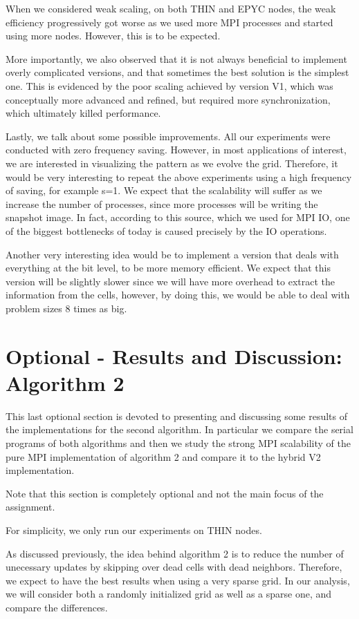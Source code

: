 \documentclass{report}
\begin{document}
When we considered weak scaling, on both THIN and EPYC nodes, the weak 
efficiency progressively got worse as we used more MPI processes and started using 
more nodes. However, this is to be expected.

More importantly, we also observed that it is not always beneficial to implement overly 
complicated versions, and that sometimes the best solution is the simplest one. 
This is evidenced by the poor scaling achieved by version V1, which was conceptually more 
advanced and refined, but required more synchronization, which ultimately killed performance.

Lastly, we talk about some possible improvements. All our experiments were conducted 
with zero frequency saving. However, in most applications of interest, we are interested 
in visualizing the pattern as we evolve the grid. Therefore, it would be very 
interesting to repeat the above experiments using a high frequency of saving, for 
example s=1. We expect that the scalability will suffer as we increase the number of 
processes, since more processes will be writing the snapshot image. In fact, according 
to this\cite{MPIIOtalk} source, which we used for MPI IO, one of the biggest bottlenecks of today 
is caused precisely by the IO operations. 

Another very interesting idea would be to implement a version that deals with everything 
at the bit level, to be more memory efficient. We expect that this version 
will be slightly slower since we will have more overhead to extract the information 
from the cells, however, by doing this, we would be able to deal with problem sizes 
8 times as big. 

\section{Optional - Results and Discussion: Algorithm 2}

This last optional section is devoted to presenting and discussing some results 
of the implementations for the second algorithm. In particular we compare the serial 
programs of both algorithms and then we study the strong MPI scalability of the pure MPI 
implementation of algorithm 2 and compare it to the hybrid V2 implementation. 

Note that this section is completely optional and not the main focus of the 
assignment. 

For simplicity, we only run our experiments on THIN nodes. 

As discussed previously, the idea behind algorithm 2 is to reduce the number of
unecessary updates by skipping over dead cells with dead neighbors. Therefore, 
we expect to have the best results when using a very sparse grid. In our analysis, 
we will consider both a randomly initialized grid as well as a sparse one, 
and compare the differences. 
\end{document}
